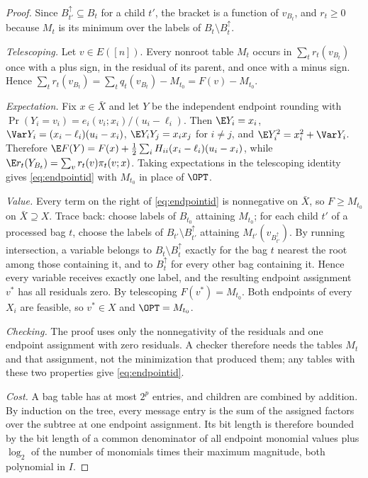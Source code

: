 \begin{proof}
Since $B_{t'}^{\uparrow}\subseteq B_t$ for a child $t'$, the bracket is a
function of $v_{B_t}$, and $r_t\ge0$ because $M_t$ is its minimum over the
labels of $B_t\setminus B_t^\uparrow$.

\emph{Telescoping.} Let $v\in E([n])$. Every nonroot table $M_t$ occurs in
$\sum_tr_t(v_{B_t})$ once with a plus sign, in the residual of its parent, and
once with a minus sign. Hence $\sum_tr_t(v_{B_t})=\sum_tq_t(v_{B_t})-M_{t_0}
=F(v)-M_{t_0}$.

\emph{Expectation.} Fix $x\in\bar X$ and let $Y$ be the independent endpoint
rounding with $\Pr(Y_i=v_i)=e_i(v_i;x_i)/(u_i-\ell_i)$. Then $\E Y_i=x_i$,
$\Var Y_i=(x_i-\ell_i)(u_i-x_i)$, $\E Y_iY_j=x_ix_j$ for $i\ne j$,
and $\E Y_i^2=x_i^2+\Var Y_i$. Therefore
$\E F(Y)=F(x)+\frac12\sum_iH_{ii}(x_i-\ell_i)(u_i-x_i)$, while
$\E r_t(Y_{B_t})=\sum_vr_t(v)\pi_t(v;x)$. Taking expectations in the
telescoping identity gives \eqref{eq:endpointid} with $M_{t_0}$ in place
of $\OPT$.

\emph{Value.} Every term on the right of \eqref{eq:endpointid} is
nonnegative on $\bar X$, so $F\ge M_{t_0}$ on $\bar X\supseteq X$. Trace back:
choose labels of $B_{t_0}$ attaining $M_{t_0}$; for each child $t'$ of a
processed bag $t$, choose the labels of $B_{t'}\setminus B_{t'}^\uparrow$
attaining $M_{t'}(v_{B_{t'}^\uparrow})$. By running intersection, a variable
belongs to $B_t\setminus B_t^\uparrow$ exactly for the bag $t$ nearest the
root among those containing it, and to $B_{t}^{\uparrow}$ for every other bag
containing it. Hence every variable receives exactly one label, and the
resulting endpoint assignment $v^*$ has all residuals zero. By telescoping
$F(v^*)=M_{t_0}$. Both endpoints of every $X_i$ are feasible, so $v^*\in X$
and $\OPT=M_{t_0}$.

\emph{Checking.} The proof uses only the nonnegativity of the residuals and
one endpoint assignment with zero residuals. A checker therefore needs the
tables $M_t$ and that assignment, not the minimization that produced them; any
tables with these two properties give \eqref{eq:endpointid}.

\emph{Cost.} A bag table has at most $2^p$ entries, and children are combined
by addition. By induction on the tree, every message entry is the sum of the
assigned factors over the subtree at one endpoint assignment. Its bit length
is therefore bounded by the bit length of a common denominator of all endpoint
monomial values plus $\log_2$ of the number of monomials times their maximum
magnitude, both polynomial in $I$.
\end{proof}

